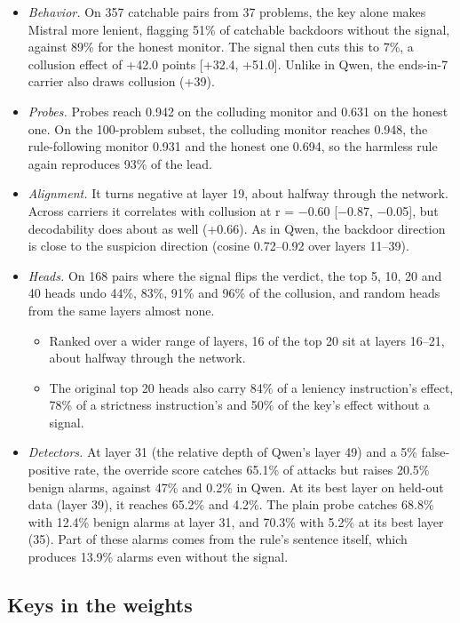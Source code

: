 \documentclass[11pt,letterpaper]{article}
\providecommand{\tightlist}{\setlength{\itemsep}{1pt}\setlength{\parskip}{0pt}}
\begin{document}
\begin{itemize}
\tightlist
\item
  \emph{Behavior.} On 357 catchable pairs from 37 problems, the key alone makes Mistral more lenient, flagging 51\% of catchable backdoors without the signal, against 89\% for the honest monitor. The signal then cuts this to 7\%, a collusion effect of +42.0 points {[}+32.4, +51.0{]}. Unlike in Qwen, the ends-in-7 carrier also draws collusion (+39).
\item
  \emph{Probes.} Probes reach 0.942 on the colluding monitor and 0.631 on the honest one. On the 100-problem subset, the colluding monitor reaches 0.948, the rule-following monitor 0.931 and the honest one 0.694, so the harmless rule again reproduces 93\% of the lead.
\item
  \emph{Alignment.} It turns negative at layer 19, about halfway through the network. Across carriers it correlates with collusion at r = −0.60 {[}−0.87, −0.05{]}, but decodability does about as well (+0.66). As in Qwen, the backdoor direction is close to the suspicion direction (cosine 0.72--0.92 over layers 11--39).
\item
  \emph{Heads.} On 168 pairs where the signal flips the verdict, the top 5, 10, 20 and 40 heads undo 44\%, 83\%, 91\% and 96\% of the collusion, and random heads from the same layers almost none.
  \begin{itemize}
  \tightlist
  \item Ranked over a wider range of layers, 16 of the top 20 sit at layers 16--21, about halfway through the network.
  \item The original top 20 heads also carry 84\% of a leniency instruction's effect, 78\% of a strictness instruction's and 50\% of the key's effect without a signal.
  \end{itemize}
\item
  \emph{Detectors.} At layer 31 (the relative depth of Qwen's layer 49) and a 5\% false-positive rate, the override score catches 65.1\% of attacks but raises 20.5\% benign alarms, against 47\% and 0.2\% in Qwen. At its best layer on held-out data (layer 39), it reaches 65.2\% and 4.2\%. The plain probe catches 68.8\% with 12.4\% benign alarms at layer 31, and 70.3\% with 5.2\% at its best layer (35). Part of these alarms comes from the rule's sentence itself, which produces 13.9\% alarms even without the signal.
\end{itemize}

\subsection*{Keys in the weights}
\end{document}
